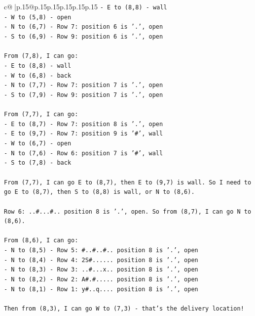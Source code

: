 \documentclass{article}
\begin{document}
{\begin{supertabular}{c@{$\;$}|p{.15\linewidth}@{}p{.15\linewidth}p{.15\linewidth}p{.15\linewidth}p{.15\linewidth}p{.15\linewidth}}
{{{\texttt{{-} E to (8,8) {-} wall} \\
\texttt{{-} W to (5,8) {-} open} \\
\texttt{{-} N to (6,7) {-} Row 7: position 6 is '.', open} \\
\texttt{{-} S to (6,9) {-} Row 9: position 6 is '.', open} \\
\\ 
\texttt{From (7,8), I can go:} \\
\texttt{{-} E to (8,8) {-} wall} \\
\texttt{{-} W to (6,8) {-} back} \\
\texttt{{-} N to (7,7) {-} Row 7: position 7 is '.', open} \\
\texttt{{-} S to (7,9) {-} Row 9: position 7 is '.', open} \\
\\ 
\texttt{From (7,7), I can go:} \\
\texttt{{-} E to (8,7) {-} Row 7: position 8 is '.', open} \\
\texttt{{-} E to (9,7) {-} Row 7: position 9 is '\#', wall} \\
\texttt{{-} W to (6,7) {-} open} \\
\texttt{{-} N to (7,6) {-} Row 6: position 7 is '\#', wall} \\
\texttt{{-} S to (7,8) {-} back} \\
\\ 
\texttt{From (7,7), I can go E to (8,7), then E to (9,7) is wall. So I need to go E to (8,7), then S to (8,8) is wall, or N to (8,6).} \\
\\ 
\texttt{Row 6: ..\#...\#.. position 8 is '.', open. So from (8,7), I can go N to (8,6).} \\
\\ 
\texttt{From (8,6), I can go:} \\
\texttt{{-} N to (8,5) {-} Row 5: \#..\#..\#.. position 8 is '.', open} \\
\texttt{{-} N to (8,4) {-} Row 4: 2S\#...... position 8 is '.', open} \\
\texttt{{-} N to (8,3) {-} Row 3: ..\#...x.. position 8 is '.', open} \\
\texttt{{-} N to (8,2) {-} Row 2: A\#.\#..... position 8 is '.', open} \\
\texttt{{-} N to (8,1) {-} Row 1: y\#..q.... position 8 is '.', open} \\
\\ 
\texttt{Then from (8,3), I can go W to (7,3) {-} that's the delivery location!} \\
}}}
\end{supertabular}}
\end{document}
